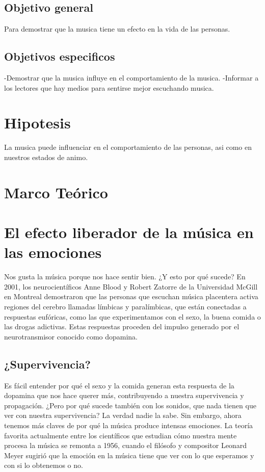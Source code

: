\documentclass{bmcart}
\begin{document}
\subsection*{Objetivo general}
Para demostrar que la musica tiene un efecto en la vida de las personas.
\subsection*{Objetivos especificos}
-Demostrar que la musica influye en el comportamiento de la musica.
\linebreak -Informar a los lectores que hay medios para sentirse mejor escuchando musica.
\section*{Hipotesis}
La musica puede influenciar en el comportamiento de las personas, asi como en nuestros estados de animo.
\section*{Marco Teórico}
\section*{El efecto liberador de la música en las emociones}
Nos gusta la música porque nos hace sentir bien. ¿Y esto por qué sucede?
En 2001, los neurocientíficos Anne Blood y Robert Zatorre de la Universidad McGill en Montreal demostraron que las personas que escuchan música placentera activa regiones del cerebro llamadas límbicas y paralímbicas, que están conectadas a respuestas eufóricas, como las que experimentamos con el sexo, la buena comida o las drogas adictivas.
Estas respuestas proceden del impulso generado por el neurotransmisor conocido como dopamina.
\subsection*{¿Supervivencia?}
Es fácil entender por qué el sexo y la comida generan esta respuesta de la dopamina que nos hace querer más, contribuyendo a nuestra supervivencia y propagación.
¿Pero por qué sucede también con los sonidos, que nada tienen que ver con nuestra supervivencia?
La verdad nadie la sabe. Sin embargo, ahora tenemos más claves de por qué la música produce intensas emociones.
La teoría favorita actualmente entre los científicos que estudian cómo nuestra mente procesa la música se remonta a 1956, cuando el filósofo y compositor Leonard Meyer sugirió que la emoción en la música tiene que ver con lo que esperamos y con si lo obtenemos o no.
\end{document}
